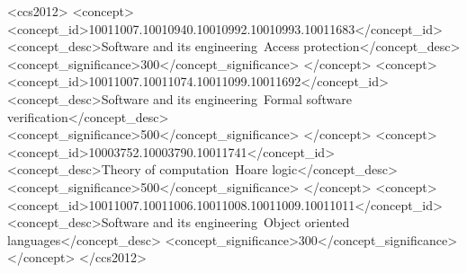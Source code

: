 \documentclass[acmsmall,review,anonymous,screen]{acmart}\settopmatter{printfolios=true,printacmref=false}
\begin{document}
\author{James Noble}


\author{Susan Eisenbach}





  

\begin{CCSXML}
<ccs2012>
   <concept>
       <concept_id>10011007.10010940.10010992.10010993.10011683</concept_id>
       <concept_desc>Software and its engineering~Access protection</concept_desc>
       <concept_significance>300</concept_significance>
       </concept>
   <concept>
       <concept_id>10011007.10011074.10011099.10011692</concept_id>
       <concept_desc>Software and its engineering~Formal software verification</concept_desc>
       <concept_significance>500</concept_significance>
       </concept>
   <concept>
       <concept_id>10003752.10003790.10011741</concept_id>
       <concept_desc>Theory of computation~Hoare logic</concept_desc>
       <concept_significance>500</concept_significance>
       </concept>
   <concept>
       <concept_id>10011007.10011006.10011008.10011009.10011011</concept_id>
       <concept_desc>Software and its engineering~Object oriented languages</concept_desc>
       <concept_significance>300</concept_significance>
       </concept>
 </ccs2012>
\end{CCSXML}
\end{document}
